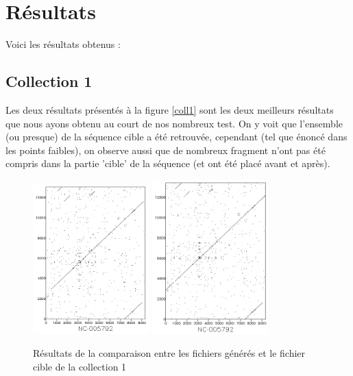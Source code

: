 \documentclass[12pt,a4paper,final]{article}
\begin{document}
\newpage
\section{Résultats}
Voici les résultats obtenus : 

\subsection{Collection 1}
Les deux résultats présentés à la figure \ref{coll1} sont les deux meilleurs résultats que nous ayons obtenu au court de nos nombreux test. On y voit que l'ensemble (ou presque) de la séquence cible a été retrouvée, cependant (tel que énoncé dans les points faibles), on observe aussi que de nombreux fragment n'ont pas été compris dans la partie 'cible' de la séquence (et ont été placé avant et après).

\begin{figure}[!ht]
	\centering
	\includegraphics[width=0.4\textwidth]{images/collection1/collection1_2.png}
	\includegraphics[width=0.4\textwidth]{images/collection1/collection1_16.png}
	\caption{\label{coll2}Résultats de la comparaison entre les fichiers générés et le fichier cible de la collection 1}
\end{figure}
\end{document}
